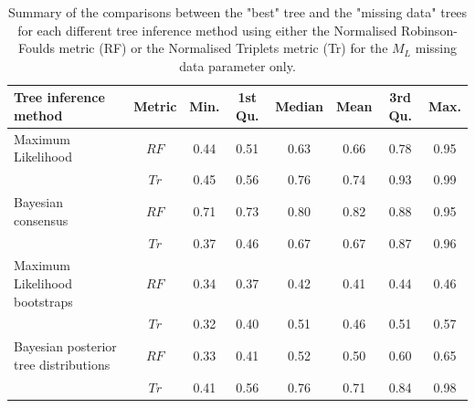 \documentclass[12pt,letterpaper]{article}
\begin{document}
\begin{landscape}
\begin{table}[ht]
\caption{Summary of the comparisons between the "best" tree and the "missing data" trees for each different tree inference method using either the Normalised Robinson-Foulds metric (RF) or the Normalised Triplets metric (Tr) for the $M_{L}$ missing data parameter only.}
\label{Tab_Supp_summary_metric_ML}
\centering
\begin{tabular}{lccccccc}
  \hline
 Tree inference method & Metric & Min. & 1st Qu. & Median & Mean & 3rd Qu. & Max. \\ 
  \hline
  Maximum Likelihood                    & $RF$ & 0.44 & 0.51 & 0.63 & 0.66 & 0.78 & 0.95 \\ 
                                        & $Tr$ & 0.45 & 0.56 & 0.76 & 0.74 & 0.93 & 0.99 \\ 
  Bayesian consensus                    & $RF$ & 0.71 & 0.73 & 0.80 & 0.82 & 0.88 & 0.95 \\ 
                                        & $Tr$ & 0.37 & 0.46 & 0.67 & 0.67 & 0.87 & 0.96 \\ 
  Maximum Likelihood bootstraps         & $RF$ & 0.34 & 0.37 & 0.42 & 0.41 & 0.44 & 0.46 \\ 
                                        & $Tr$ & 0.32 & 0.40 & 0.51 & 0.46 & 0.51 & 0.57 \\ 
  Bayesian posterior tree distributions & $RF$ & 0.33 & 0.41 & 0.52 & 0.50 & 0.60 & 0.65 \\ 
                                        & $Tr$ & 0.41 & 0.56 & 0.76 & 0.71 & 0.84 & 0.98 \\ 
   \hline
\end{tabular}
\end{table}
\end{landscape}
\end{document}
